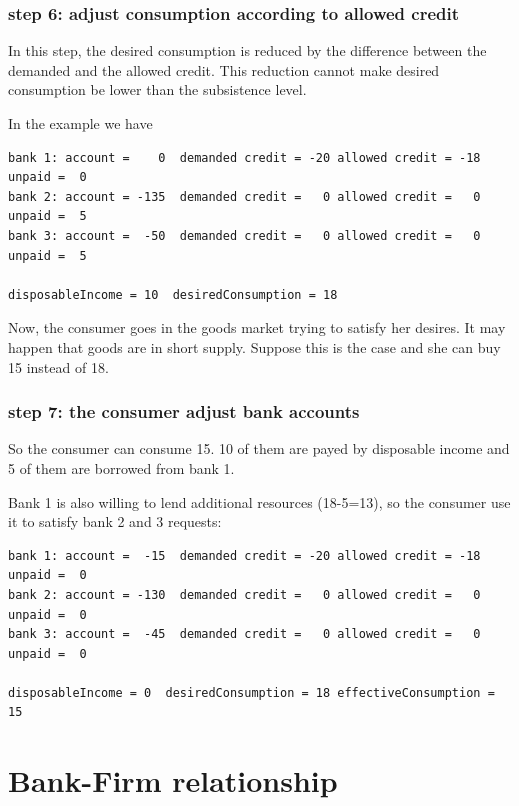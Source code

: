 \documentclass{article}
\begin{document}
\subsubsection*{step 6: adjust consumption according to allowed credit}

In this step, the desired consumption is reduced by the difference between the demanded and the allowed credit. This reduction cannot make desired consumption be lower than the subsistence level.

In the example we have

\begin{verbatim}
bank 1: account =    0  demanded credit = -20 allowed credit = -18 unpaid =  0
bank 2: account = -135  demanded credit =   0 allowed credit =   0 unpaid =  5
bank 3: account =  -50  demanded credit =   0 allowed credit =   0 unpaid =  5

disposableIncome = 10  desiredConsumption = 18
\end{verbatim}

Now, the consumer goes in the goods market trying to satisfy her desires. It may happen that goods are in short supply. Suppose this is the case and she can buy 15 instead of 18. 

\subsubsection*{step 7: the consumer adjust bank accounts}

So the consumer can consume 15. 10 of them are payed by disposable income and 5 of them are borrowed from bank 1. 

Bank 1 is also willing to lend additional resources (18-5=13), so the consumer use it to satisfy bank 2 and 3 requests:

\begin{verbatim}
bank 1: account =  -15  demanded credit = -20 allowed credit = -18 unpaid =  0
bank 2: account = -130  demanded credit =   0 allowed credit =   0 unpaid =  0
bank 3: account =  -45  demanded credit =   0 allowed credit =   0 unpaid =  0

disposableIncome = 0  desiredConsumption = 18 effectiveConsumption = 15
\end{verbatim}



\section{Bank-Firm relationship}
\end{document}

